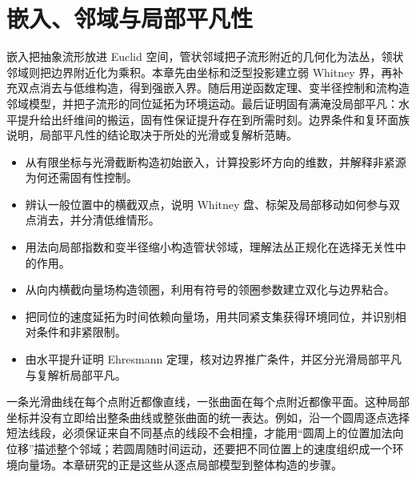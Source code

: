 
% 
% 

\chapter{嵌入、邻域与局部平凡性}
\label{g2:ch:15}

\begin{chapterabstract}
	嵌入把抽象流形放进 Euclid 空间，管状邻域把子流形附近的几何化为法丛，领状邻域则把边界附近化为乘积。本章先由坐标和泛型投影建立弱 Whitney 界，再补充双点消去与低维构造，得到强嵌入界。随后用逆函数定理、变半径控制和流构造邻域模型，并把子流形的同位延拓为环境运动。最后证明固有满淹没局部平凡：水平提升给出纤维间的搬运，固有性保证提升存在到所需时刻。边界条件和复环面族说明，局部平凡性的结论取决于所处的光滑或复解析范畴。
\end{chapterabstract}

\begin{learninggoals}
	\begin{itemize}
		\item 从有限坐标与光滑截断构造初始嵌入，计算投影坏方向的维数，并解释非紧源为何还需固有性控制。
		\item 辨认一般位置中的横截双点，说明 Whitney 盘、标架及局部移动如何参与双点消去，并分清低维情形。
		\item 用法向局部指数和变半径缩小构造管状邻域，理解法丛正规化在选择无关性中的作用。
		\item 从向内横截向量场构造领圈，利用有符号的领圈参数建立双化与边界粘合。
		\item 把同位的速度延拓为时间依赖向量场，用共同紧支集获得环境同位，并识别相对条件和非紧限制。
		\item 由水平提升证明 Ehresmann 定理，核对边界推广条件，并区分光滑局部平凡与复解析局部平凡。
	\end{itemize}
\end{learninggoals}

一条光滑曲线在每个点附近都像直线，一张曲面在每个点附近都像平面。这种局部坐标并没有立即给出整条曲线或整张曲面的统一表达。例如，沿一个圆周逐点选择短法线段，必须保证来自不同基点的线段不会相撞，才能用“圆周上的位置加法向位移”描述整个邻域；若圆周随时间运动，还要把不同位置上的速度组织成一个环境向量场。本章研究的正是这些从逐点局部模型到整体构造的步骤。

